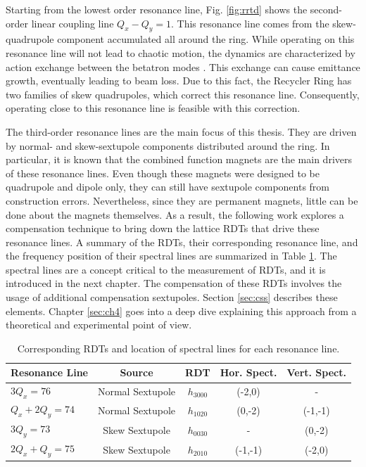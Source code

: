 Starting from the lowest order resonance line, Fig. \ref{fig:rrtd} shows the second-order linear coupling line $Q_x-Q_y = 1$. This resonance line comes from the skew-quadrupole component accumulated all around the ring. While operating on this resonance line will not lead to chaotic motion, the dynamics are characterized by action exchange between the betatron modes \cite{sylee}. This exchange can cause emittance growth, eventually leading to beam loss. Due to this fact, the Recycler Ring has two families of skew quadrupoles, which correct this resonance line. Consequently, operating close to this resonance line is feasible with this correction.

The third-order resonance lines are the main focus of this thesis. They are driven by normal- and skew-sextupole components distributed around the ring. In particular, it is known that the combined function magnets are the main drivers of these resonance lines. Even though these magnets were designed to be quadrupole and dipole only, they can still have sextupole components from construction errors. Nevertheless, since they are permanent magnets, little can be done about the magnets themselves. As a result, the following work explores a compensation technique to bring down the lattice RDTs that drive these resonance lines. A summary of the RDTs, their corresponding resonance line, and the frequency position of their spectral lines are summarized in Table \ref{tab:rdtlines}. The spectral lines are a concept critical to the measurement of RDTs, and it is introduced in the next chapter. The compensation of these RDTs involves the usage of additional compensation sextupoles. Section \ref{sec:css} describes these elements. Chapter \ref{sec:ch4} goes into a deep dive explaining this approach from a theoretical and experimental point of view. 

\begin{table}[H]
   \centering
   \caption{Corresponding RDTs and location of spectral lines for each resonance line.}
   \begin{tabular}{lcccc}
       \toprule
       \textbf{Resonance Line} & \textbf{Source} & \textbf{RDT} & \textbf{Hor. Spect.} & \textbf{Vert. Spect.} \\
       \midrule
           $3Q_x=76$     & Normal Sextupole    & $h_{3000}$           &  (-2,0)  & -       \\ %
          $Q_x+2Q_y=74$   & Normal Sextupole    & $h_{1020}$            & (0,-2) & (-1,-1)       \\ %
           $3Q_y=73$     & Skew Sextupole   & $h_{0030}$           & - & (0,-2)        \\ %
           $2Q_x+Q_y=75$   & Skew Sextupole    & $h_{2010}$     & (-1,-1) & (-2,0)       \\
       \bottomrule
   \end{tabular}
   \label{tab:rdtlines}
\end{table}

